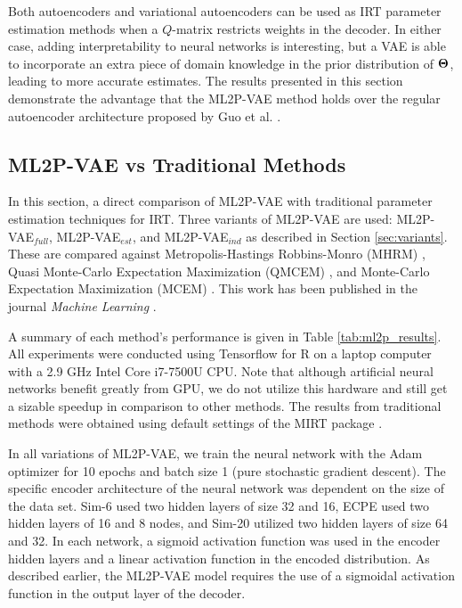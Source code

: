 Both autoencoders and variational autoencoders can be used as IRT parameter estimation methods when a $Q$-matrix restricts weights in the decoder. In either case, adding interpretability to neural networks is interesting, but a VAE is able to incorporate an extra piece of domain knowledge in the prior distribution of $\boldsymbol{\Theta}$, leading to more accurate estimates. The results presented in this section demonstrate the advantage that the ML2P-VAE method holds over the regular autoencoder architecture proposed by Guo et al. \cite{guo2017}.


\subsection{ML2P-VAE vs Traditional Methods}\label{sec:ml2pvae_compare}
In this section, a direct comparison of ML2P-VAE with traditional parameter estimation techniques for IRT. Three variants of ML2P-VAE are used: ML2P-VAE$_{full}$, ML2P-VAE$_{est}$, and ML2P-VAE$_{ind}$ as described in Section \ref{sec:variants}. These are compared against Metropolis-Hastings Robbins-Monro (MHRM) \cite{cai2009}, Quasi Monte-Carlo Expectation Maximization (QMCEM) \cite{mirt}, and Monte-Carlo Expectation Maximization (MCEM) \cite{bock1981}. This work has been published in the journal \textit{Machine Learning} \cite{ml_paper}.

A summary of each method's performance is given in Table \ref{tab:ml2p_results}. All experiments were conducted using Tensorflow for R on a laptop computer with a 2.9 GHz Intel Core i7-7500U CPU. Note that although artificial neural networks benefit greatly from GPU, we do not utilize this hardware and still get a sizable speedup in comparison to other methods. The results from traditional methods were obtained using default settings of the MIRT package \cite{mirt}. 

In all variations of ML2P-VAE, we train the neural network with the Adam optimizer \cite{adam} for 10 epochs and batch size 1 (pure stochastic gradient descent). The specific encoder architecture of the neural network was dependent on the size of the data set. Sim-6 used two hidden layers of size 32 and 16, ECPE used two hidden layers of 16 and 8 nodes, and Sim-20 utilized two hidden layers of size 64 and 32. In each network, a sigmoid activation function was used in the encoder hidden layers and a linear activation function in the encoded distribution. As described earlier, the ML2P-VAE model requires the use of a sigmoidal activation function in the output layer of the decoder.

